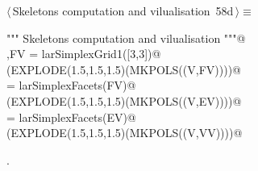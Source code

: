 \documentclass[11pt,oneside]{article}	%
\begin{document}
\begin{flushleft} \small \label{scrap110}
\protect{}$\langle\,$Skeletons computation and vilualisation\nobreak\ {\footnotesize 58d}$\,\rangle\equiv$
\vspace{-1ex}
\begin{list}{}{} \item
\mbox{}\verb@""" Skeletons computation and vilualisation """@\\
\mbox{}\verb@V,FV = larSimplexGrid1([3,3])@\\
\mbox{}\verb@VIEW(EXPLODE(1.5,1.5,1.5)(MKPOLS((V,FV))))@\\
\mbox{}\verb@EV = larSimplexFacets(FV)@\\
\mbox{}\verb@VIEW(EXPLODE(1.5,1.5,1.5)(MKPOLS((V,EV))))@\\
\mbox{}\verb@VV = larSimplexFacets(EV)@\\
\mbox{}\verb@VIEW(EXPLODE(1.5,1.5,1.5)(MKPOLS((V,VV))))@\\
\mbox{}\verb@@{\NWsep}
\end{list}
\vspace{-1ex}
\footnotesize\addtolength{\baselineskip}{-1ex}
\begin{list}{}{\setlength{\itemsep}{-\parsep}\setlength{\itemindent}{-\leftmargin}}
\item {\NWtxtMacroNoRef}.
\end{list}
\end{flushleft}
\end{document}
